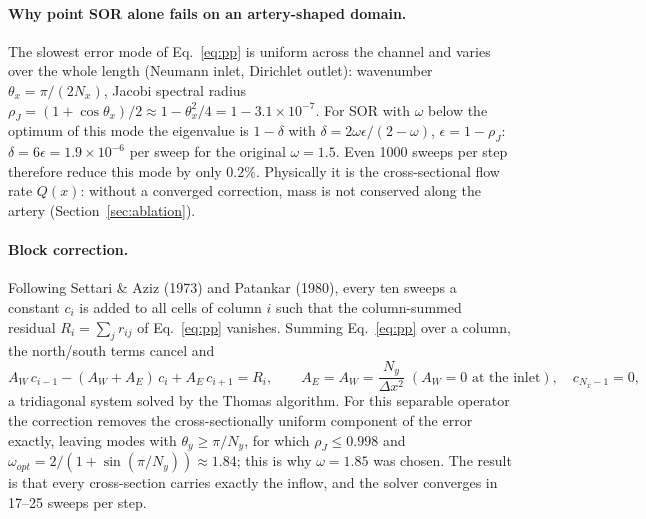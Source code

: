 \paragraph{Why point SOR alone fails on an artery-shaped domain.} The slowest error mode of Eq.~\eqref{eq:pp} is uniform across the channel and varies over the whole length (Neumann inlet, Dirichlet outlet): wavenumber $\theta_x=\pi/(2N_x)$, Jacobi spectral radius $\rho_J=(1+\cos\theta_x)/2\approx1-\theta_x^2/4=1-3.1\times10^{-7}$. For SOR with $\omega$ below the optimum of this mode the eigenvalue is $1-\delta$ with $\delta=2\omega\epsilon/(2-\omega)$, $\epsilon=1-\rho_J$: $\delta=6\epsilon=1.9\times10^{-6}$ per sweep for the original $\omega=1.5$. Even 1000 sweeps per step therefore reduce this mode by only $0.2\%$. Physically it is the cross-sectional flow rate $Q(x)$: without a converged correction, mass is not conserved along the artery (Section~\ref{sec:ablation}).

\paragraph{Block correction.} Following Settari \& Aziz (1973) and Patankar (1980), every ten sweeps a constant $c_i$ is added to all cells of column $i$ such that the column-summed residual $R_i=\sum_j r_{ij}$ of Eq.~\eqref{eq:pp} vanishes. Summing Eq.~\eqref{eq:pp} over a column, the north/south terms cancel and
\begin{equation}
A_W\,c_{i-1}-(A_W+A_E)\,c_i+A_E\,c_{i+1}=R_i,\qquad A_E=A_W=\frac{N_y}{\Delta x^2}\;(A_W=0\text{ at the inlet}),\quad c_{N_x-1}=0,
\end{equation}
a tridiagonal system solved by the Thomas algorithm. For this separable operator the correction removes the cross-sectionally uniform component of the error exactly, leaving modes with $\theta_y\ge\pi/N_y$, for which $\rho_J\le0.998$ and $\omega_{opt}=2/(1+\sin(\pi/N_y))\approx1.84$; this is why $\omega=1.85$ was chosen. The result is that every cross-section carries exactly the inflow, and the solver converges in 17--25 sweeps per step.


